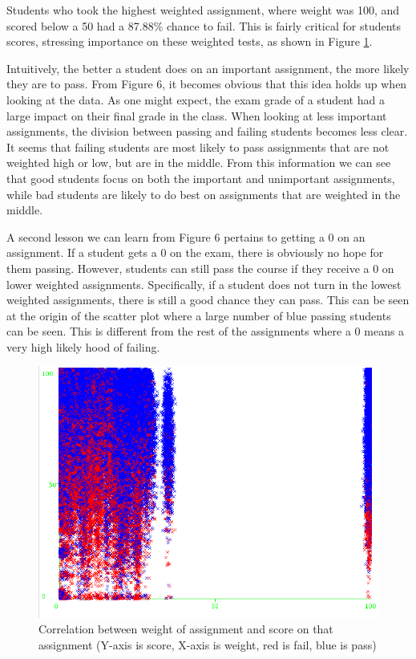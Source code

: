 \documentclass[12pt]{article}
\begin{document}
Students who took the highest weighted assignment, where weight was 100, and scored below a 50 had a 87.88\% chance to fail. This is fairly critical for students scores, stressing importance on these weighted tests, as shown in Figure \ref{fig:weightVSscore}.

Intuitively, the better a student does on an important assignment, the more likely they are to pass. From Figure 6, it becomes obvious that this idea holds up when looking at the data. As one might expect, the exam grade of a student had a large impact on their final grade in the class. When looking at less important assignments, the division between passing and failing students becomes less clear. It seems that failing students are most likely to pass assignments that are not weighted high or low, but are in the middle. From this information we can see that good students focus on both the important and unimportant assignments, while bad students are likely to do best on assignments that are weighted in the middle.

A second lesson we can learn from Figure 6 pertains to getting a 0 on an assignment. If a student gets a 0 on the exam, there is obviously no hope for them passing. However, students can still pass the course if they receive a 0 on lower weighted assignments. Specifically, if a student does not turn in the lowest weighted assignments, there is still a good chance they can pass. This can be seen at the origin of the scatter plot where a large number of blue passing students can be seen. This is different from the rest of the assignments where a 0 means a very high likely hood of failing.

 \begin{figure}[h]
 \centering
 \includegraphics[scale =1]{weightscore.png}
 \caption{Correlation between weight of assignment and score on that assignment (Y-axis is score, X-axis is weight, red is fail, blue is pass)}
 \label{fig:weightVSscore}
 \end{figure} 
\end{document}
